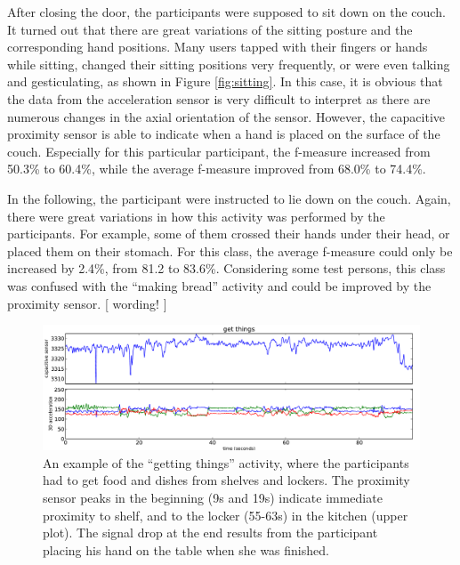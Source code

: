\documentclass[runningheads,a4paper]{llncs}
\begin{document}
After closing the door, the participants were supposed to sit down on the couch. It turned out that there are great variations of the sitting posture and the corresponding hand positions. Many users tapped with their fingers or hands while sitting, changed their sitting positions very frequently, or were even talking and gesticulating, as shown in Figure \ref{fig:sitting}. In this case, it is obvious that the data from the acceleration sensor is very difficult to interpret as there are numerous changes in the axial orientation of the sensor. However, the capacitive proximity sensor is able to indicate when a hand is placed on the surface of the couch. Especially for this particular participant, the f-measure increased from 50.3\% to 60.4\%, while the average f-measure improved from 68.0\% to 74.4\%. 

In the following, the participant were instructed to lie  down on the couch. Again, there were great variations in how this activity was performed by the participants. For example, some of them crossed their hands under their head, or placed them on their stomach. For this class, the average f-measure could only be increased by 2.4\%, from 81.2 to 83.6\%. Considering some test persons, this class was confused with the ``making bread'' activity and could be improved by the proximity sensor. [ wording! ] 

\begin{figure}
	\centering
		\includegraphics[width=\textwidth]{../Auswertung/images/tobias_4.pdf}
	\caption{An example of the ``getting things'' activity, where the participants had to get food and dishes from shelves and lockers. The proximity sensor peaks in the beginning (9s and 19s) indicate immediate proximity to shelf, and to the locker (55-63s) in the kitchen (upper plot). The signal drop at the end results from the participant placing his hand on the table when she was finished.}
	\label{fig:get_things}
\end{figure}
\end{document}
